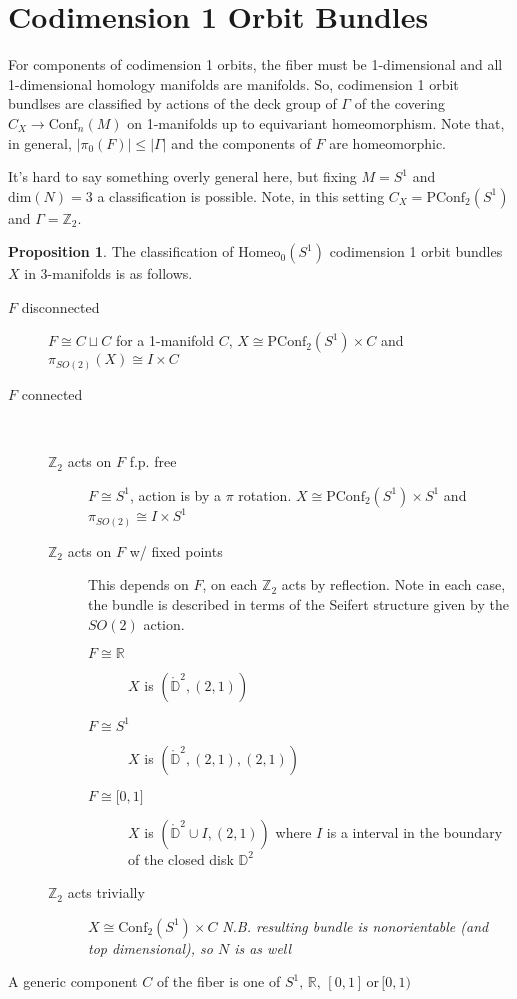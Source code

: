 \documentclass[10pt, oneside]{article}
\newcommand{\R}{\mathbb{R}}
\newcommand{\Z}{\mathbb{Z}}
\newcommand{\homeo}[1][S^1]{\text{Homeo}_0(#1)}
\newcommand{\conf}[2][S^1]{\text{Conf}_{#2}(#1)}
\newcommand{\pconf}[2][S^1]{\text{PConf}_{#2}(#1)}
\theoremstyle{definition}
\newtheorem{prop}{Proposition}[section]
\theoremstyle{definition}
\begin{document}
\section{Codimension 1 Orbit Bundles}
For components of codimension 1 orbits, 
the fiber must be 1-dimensional 
and all 1-dimensional homology manifolds are manifolds. 
So, 
codimension 1 orbit bundlses are classified 
by actions of the deck group of $\Gamma$ 
of the covering $C_X \to \conf[M]{n}$ on 1-manifolds 
up to equivariant homeomorphism.
Note that, 
in general, $\lvert \pi_0(F) \rvert \leq \lvert \Gamma \rvert$ 
and the components of $F$ are homeomorphic. 

It's hard to say something overly general here, 
but fixing $M = S^1$ 
and $\text{dim}(N)=3$ a classification is possible. 
Note, in this setting $C_X = \pconf{2}$ and $\Gamma = \Z_2$.

\begin{prop}
    The classification of $\homeo$ codimension 1 orbit bundles $X$ in 3-manifolds is as follows. 
    \begin{description}
        \item[$F$ disconnected] $F\cong C\sqcup C$ for a 1-manifold $C$, $X\cong \pconf{2}\times C$ and $\pi_{SO(2)}(X) \cong I \times C$
        \item[$F$ connected] \ 
        \begin{description}
            \item[$\Z_2$ acts on $F$ f.p. free] $F\cong S^1$, action is by a $\pi$ rotation. $X\cong \pconf{2} \times S^1$ and $\pi_{SO(2)} \cong I\times S^1$
            \item[$\Z_2$ acts on $F$ w/ fixed points] This depends on $F$, on each $\Z_2$ acts by reflection. Note in each case, the bundle is described in terms of the Seifert structure given by the $SO(2)$ action.
            \begin{description}
                \item[$F\cong \R$] $X$ is $(\mathring{\mathbb{D}}^2, (2, 1))$
                \item[$F\cong S^1$] $X$ is $(\mathring{\mathbb{D}}^2, (2, 1), (2,1))$
                \item[$F \cong \lbrack 0,1\rbrack$] $X$ is $(\mathring{\mathbb{D}}^2\cup I, (2,1))$ where $I$ is a interval in the boundary of the closed disk $\mathbb{D}^2$
            \end{description}
            \item[$\Z_2$ acts trivially] $X\cong\conf{2}\times C$ {\it N.B. resulting bundle is nonorientable (and top dimensional), so $N$ is as well} 
        \end{description}
    \end{description}
    A generic component $C$ of the fiber is one of $S^1,\, \mathbb{R},\, [0,1]\, \text{or}\,  [0,1)$
\end{prop}
\end{document}
